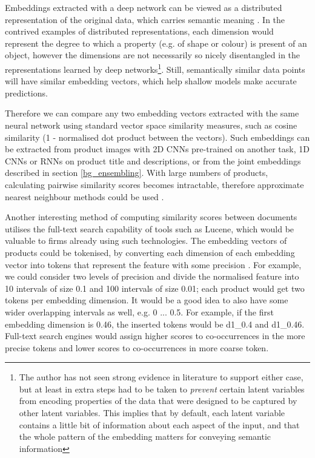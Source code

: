 Embeddings extracted with a deep network can be viewed as a distributed representation of the original data, which carries semantic meaning \cite{distributed_reps}.
In the contrived examples of distributed representations, each dimension would represent the degree to which a property (e.g. of shape or colour) is present of an object, however the dimensions are not necessarily so nicely disentangled in the representations learned by deep networks\footnote{The author has not seen strong evidence in literature to support either case, but at least in \cite{towards} extra steps had to be taken to \textit{prevent} certain latent variables from encoding properties of the data that were designed to be captured by other latent variables. This implies that by default, each latent variable contains a little bit of information about each aspect of the input, and that the whole pattern of the embedding matters for conveying semantic information}.
Still, semantically similar data points will have similar embedding vectors, which help shallow models make accurate predictions.

Therefore we can compare any two embedding vectors extracted with the same neural network using standard vector space similarity measures, such as cosine similarity (1 - normalised dot product between the vectors).
Such embeddings can be extracted from product images with 2D CNNs pre-trained on another task, 1D CNNs or RNNs on product title and descriptions, or from the joint embeddings described in section \ref{bg_ensembling}.
With large numbers of products, calculating pairwise similarity scores becomes intractable, therefore approximate nearest neighbour methods could be used \cite{nmslib}.

Another interesting method of computing similarity scores between documents utilises the full-text search capability of tools such as Lucene, which would be valuable to firms already using such technologies.
The embedding vectors of products could be tokenised, by converting each dimension of each embedding vector into tokens that represent the feature with some precision \cite{vec_fulltext}.
For example, we could consider two levels of precision and divide the normalised feature into 10 intervals of size 0.1 and 100 intervals of size 0.01; each product would get two tokens per embedding dimension.
It would be a good idea to also have some wider overlapping intervals as well, e.g. 0 ... 0.5.
For example, if the first embedding dimension is 0.46, the inserted tokens would be d1\_0.4 and d1\_0.46.
Full-text search engines would assign higher scores to co-occurrences in the more precise tokens and lower scores to co-occurrences in more coarse token.

